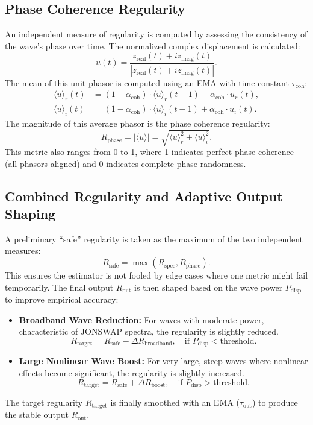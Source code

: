 \documentclass[11pt]{article}
\begin{document}
\subsection{Phase Coherence Regularity}
An independent measure of regularity is computed by assessing the consistency of the wave's phase over time. The normalized complex displacement is calculated:
\begin{equation}
u(t) = \frac{z_{\text{real}}(t) + i z_{\text{imag}}(t)}{|z_{\text{real}}(t) + i z_{\text{imag}}(t)|}.
\end{equation}
The mean of this unit phasor is computed using an EMA with time constant $\tau_{\text{coh}}$:
\begin{align}
\langle u \rangle_r(t) &= (1 - \alpha_{\text{coh}}) \cdot \langle u \rangle_r(t-1) + \alpha_{\text{coh}} \cdot u_r(t), \\
\langle u \rangle_i(t) &= (1 - \alpha_{\text{coh}}) \cdot \langle u \rangle_i(t-1) + \alpha_{\text{coh}} \cdot u_i(t).
\end{align}
The magnitude of this average phasor is the phase coherence regularity:
\begin{equation}
R_{\text{phase}} = | \langle u \rangle | = \sqrt{ \langle u \rangle_r^2 + \langle u \rangle_i^2 }.
\end{equation}
This metric also ranges from 0 to 1, where 1 indicates perfect phase coherence (all phasors aligned) and 0 indicates complete phase randomness.

\subsection{Combined Regularity and Adaptive Output Shaping}
A preliminary ``safe'' regularity is taken as the maximum of the two independent measures:
\begin{equation}
R_{\text{safe}} = \max(R_{\text{spec}}, R_{\text{phase}}).
\end{equation}
This ensures the estimator is not fooled by edge cases where one metric might fail temporarily. The final output $R_{\text{out}}$ is then shaped based on the wave power $P_{\text{disp}}$ to improve empirical accuracy:
\begin{itemize}
    \item \textbf{Broadband Wave Reduction:} For waves with moderate power, characteristic of JONSWAP spectra, the regularity is slightly reduced.
    \[
    R_{\text{target}} = R_{\text{safe}} - \Delta R_{\text{broadband}}, \quad \text{if } P_{\text{disp}} < \text{threshold}.
    \]
    \item \textbf{Large Nonlinear Wave Boost:} For very large, steep waves where nonlinear effects become significant, the regularity is slightly increased.
    \[
    R_{\text{target}} = R_{\text{safe}} + \Delta R_{\text{boost}}, \quad \text{if } P_{\text{disp}} > \text{threshold}.
    \]
\end{itemize}
The target regularity $R_{\text{target}}$ is finally smoothed with an EMA ($\tau_{\text{out}}$) to produce the stable output $R_{\text{out}}$.
\end{document}
